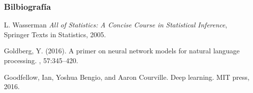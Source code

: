 \documentclass[handout]{beamer}
\begin{document}
\begin{frame}[allowframebreaks]\scriptsize
\frametitle{Bilbiografía}
\begin{thebibliography}{8}

L. Wasserman \emph{All of Statistics: A Concise Course in Statistical Inference}, Springer Texts in Statistics, 2005.

Goldberg, Y. (2016).
\newblock A primer on neural network models for natural language processing.
, 57:345--420.

Goodfellow, Ian, Yoshua Bengio, and Aaron Courville.
\newblock Deep learning. MIT press, 2016.



\end{thebibliography}


\end{frame}




\end{document}
